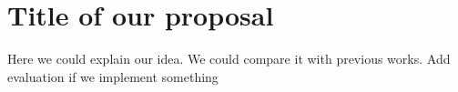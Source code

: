 \section{Title of our proposal}
Here we could explain our idea. We could compare it with previous works.
Add evaluation if we implement something